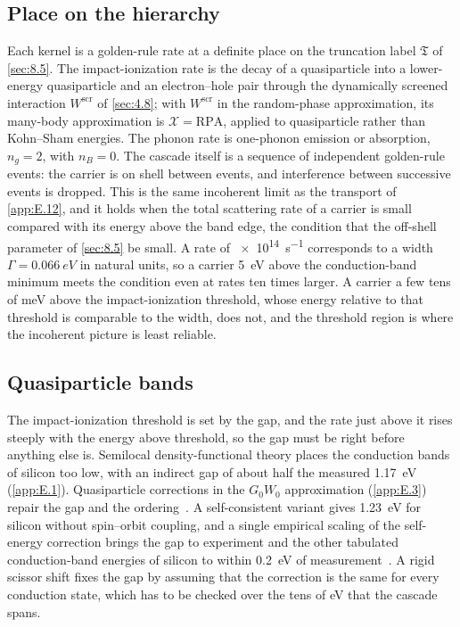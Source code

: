\subsection{Place on the hierarchy}

Each kernel is a golden-rule rate at a definite place on the truncation label $\mathfrak{T}$ of \cref{sec:8.5}. The impact-ionization rate is the decay of a quasiparticle into a lower-energy quasiparticle and an electron--hole pair through the dynamically screened interaction $W^{\mathrm{scr}}$ of \cref{sec:4.8}; with $W^{\mathrm{scr}}$ in the random-phase approximation, its many-body approximation is $\mathcal{X} = \mathrm{RPA}$, applied to quasiparticle rather than Kohn--Sham energies. The phonon rate is one-phonon emission or absorption, $n_g = 2$, with $n_B = 0$. The cascade itself is a sequence of independent golden-rule events: the carrier is on shell between events, and interference between successive events is dropped. This is the same incoherent limit as the transport of \cref{app:E.12}, and it holds when the total scattering rate of a carrier is small compared with its energy above the band edge, the condition that the off-shell parameter of \cref{sec:8.5} be small. A rate of \SI{e14}{s^{-1}} corresponds to a width $\varGamma = \SI{0.066}{eV}$ in natural units, so a carrier \SI{5}{eV} above the conduction-band minimum meets the condition even at rates ten times larger. A carrier a few tens of meV above the impact-ionization threshold, whose energy relative to that threshold is comparable to the width, does not, and the threshold region is where the incoherent picture is least reliable.

\subsection{Quasiparticle bands}

The impact-ionization threshold is set by the gap, and the rate just above it rises steeply with the energy above threshold, so the gap must be right before anything else is. Semilocal density-functional theory places the conduction bands of silicon too low, with an indirect gap of about half the measured \SI{1.17}{eV} (\cref{app:E.1}). Quasiparticle corrections in the $G_0W_0$ approximation (\cref{app:E.3}) repair the gap and the ordering~\cite{hybertsen1986electron}. A self-consistent variant gives \SI{1.23}{eV} for silicon without spin--orbit coupling, and a single empirical scaling of the self-energy correction brings the gap to experiment and the other tabulated conduction-band energies of silicon to within \SI{0.2}{eV} of measurement~\cite[Table~I]{kotani2010impact}. A rigid scissor shift fixes the gap by assuming that the correction is the same for every conduction state, which has to be checked over the tens of eV that the cascade spans.


